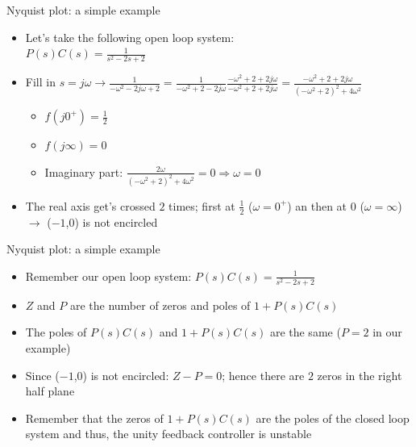 \begin{frame}{Nyquist plot: a simple example}
\begin{itemize}
\item Let’s take the following open loop system:
\\ $P(s)C(s) = \frac{1}{s^2-2s+2}$
\item Fill in $s =j\omega \rightarrow \frac{1}{-\omega^2 -2j\omega +2} = \frac{1}{-\omega^2 +2 -2j\omega}\frac{-\omega^2 +2 +2j\omega}{-\omega^2 +2 +2j\omega}= \frac{-\omega^2+2+2j\omega}{(-\omega^2+2)^2+4\omega^2}$
\begin{itemize}
\item $f(j0^+) = \frac{1}{2}$
\item $f(j\infty) = 0 $
\item Imaginary part: $\frac{2\omega}{(-\omega^2+2)^2+4\omega^2}=0 \Rightarrow \omega = 0$
\end{itemize}
\item The real axis get's crossed $2$ times; first at $\frac{1}{2}$ ($\omega = 0^+$) an then at $0$ ($\omega = \infty$)$\rightarrow$ ($-1$,$0$) is not encircled
\end{itemize}
\end{frame}

\begin{frame}{Nyquist plot: a simple example}
\begin{itemize}
\item Remember our open loop system: $P(s)C(s) = \frac{1}{s^2-2s+2}$
\item $Z$ and $P$ are the number of zeros and poles of $1+P(s)C(s)$
\item The poles of $P(s)C(s)$ and $1+P(s)C(s)$ are the same ($P=2$ in our example)
\item Since ($-1$,$0$) is not encircled: $Z-P=0$; hence there are $2$ zeros in the right half plane
\item Remember that the zeros of $1+P(s)C(s)$ are the poles of the closed loop system and thus, the unity feedback controller is unstable
\end{itemize}
\end{frame}

